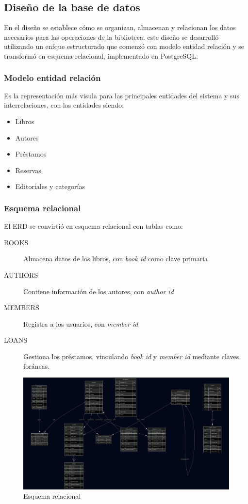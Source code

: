 \documentclass[12pt, a4paper]{article}
\begin{document}
\newpage

\subsection{Diseño de la base de datos}
En el diseño se establece cómo se organizan, almacenan y relacionan los datos necesarios para las operaciones de la biblioteca. este diseño se desarrolló utilizando un enfque estructurado que comenzó con modelo entidad relación y se transformó en esquema relacional, implementado en PostgreSQL.

\subsubsection{Modelo entidad relación}
Es la representación más visula para las principales entidades del sistema y sus interrelaciones, con las entidades siendo:
\begin{itemize}
 \item Libros
 \item Autores
 \item Préstamos
 \item Reservas
 \item Editoriales y categorías
\end{itemize}

\subsubsection{Esquema relacional}
El ERD se convirtió en esquema relacional con tablas como:

\begin{description}
 \item [BOOKS] Almacena datos de los libros, con \textit{book id} como clave primaria
 \item [AUTHORS] Contiene información de los autores, con \textit{author id}
 \item [MEMBERS] Registra a los usuarios, con \textit{member id}
 \item [LOANS] Gestiona los préstamos, vinculando \textit{book id} y \textit{member id} mediante claves foráneas.
\end{description}

\begin{figure}[htbp]
    \centering
    \includegraphics[width=\textwidth]{diagrama.png}
    \caption{Esquema relacional}
\end{figure}
\end{document}
